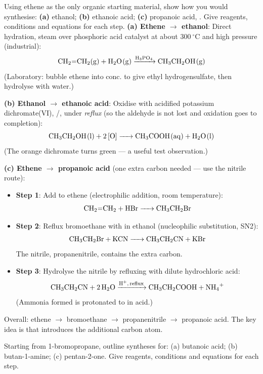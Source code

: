 \documentclass[11pt]{article}
\begin{document}
\begin{exoresolu}
Using ethene as the only organic starting material, show how you would synthesise: \textbf{(a)} ethanol; \textbf{(b)} ethanoic acid; \textbf{(c)} propanoic acid, . Give reagents, conditions and equations for each step.
\tcblower
\textbf{(a) Ethene $\rightarrow$ ethanol}: Direct hydration, steam over phosphoric acid catalyst at about $\SI{300}{\ensuremath{{}^{\circ}\mathrm{C}}}$ and high pressure (industrial):
\[ \ce{CH2=CH2(g) + H2O(g) ->[H3PO4] CH3CH2OH(g)} \]
(Laboratory: bubble ethene into conc.  to give ethyl hydrogensulfate, then hydrolyse with water.)

\textbf{(b) Ethanol $\rightarrow$ ethanoic acid}: Oxidise with acidified potassium dichromate(VI), /, under \emph{reflux} (so the aldehyde is not lost and oxidation goes to completion):
\[ \ce{CH3CH2OH(l) + 2[O] -> CH3COOH(aq) + H2O(l)} \]
(The orange dichromate turns green — a useful test observation.)

\textbf{(c) Ethene $\rightarrow$ propanoic acid} (one extra carbon needed — use the nitrile route):
\begin{itemize}
\item \textbf{Step 1}: Add  to ethene (electrophilic addition, room temperature):
\[ \ce{CH2=CH2 + HBr -> CH3CH2Br} \]
\item \textbf{Step 2}: Reflux bromoethane with  in ethanol (nucleophilic substitution, SN2):
\[ \ce{CH3CH2Br + KCN -> CH3CH2CN + KBr} \]
The nitrile, propanenitrile, contains the extra carbon.
\item \textbf{Step 3}: Hydrolyse the nitrile by refluxing with dilute hydrochloric acid:
\[ \ce{CH3CH2CN + 2H2O ->[H+, reflux] CH3CH2COOH + NH4+} \]
(Ammonia formed is protonated to  in acid.)
\end{itemize}
Overall: ethene $\rightarrow$ bromoethane $\rightarrow$ propanenitrile $\rightarrow$ propanoic acid. The key idea is that  introduces the additional carbon atom.
\end{exoresolu}

\begin{exercice}
Starting from 1-bromopropane, outline syntheses for: (a) butanoic acid; (b) butan-1-amine; (c) pentan-2-one. Give reagents, conditions and equations for each step.
\end{exercice}
\end{document}
